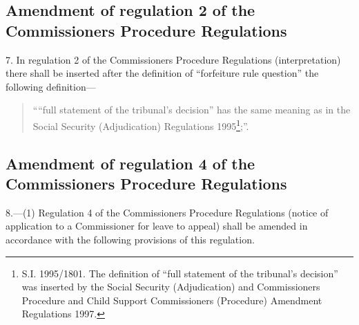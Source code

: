 \documentclass[12pt,a4paper]{article}
\begin{document}
%
%
%
%

\subsection[7. Amendment of regulation 2 of the Commissioners Procedure Regulations]{Amendment of regulation 2 of the Commissioners Procedure Regulations}

7.  In regulation 2 of the Commissioners Procedure Regulations (interpretation) there shall be inserted after the definition of “forfeiture rule question” the following definition—
\begin{quotation}
““full statement of the tribunal’s decision” has the same meaning as in the Social Security (Adjudication) Regulations 1995\footnote{\frenchspacing S.I. 1995/1801. The definition of “full statement of the tribunal’s decision” was inserted by the Social Security (Adjudication) and Commissioners Procedure and Child Support Commissioners (Procedure) Amendment Regulations 1997.};”.
\end{quotation}

\subsection[8. Amendment of regulation 4 of the Commissioners Procedure Regulations]{Amendment of regulation 4 of the Commissioners Procedure Regulations}

8.—(1) Regulation 4 of the Commissioners Procedure Regulations (notice of application to a Commissioner for leave to appeal) shall be amended in accordance with the following provisions of this regulation.
\end{document}
